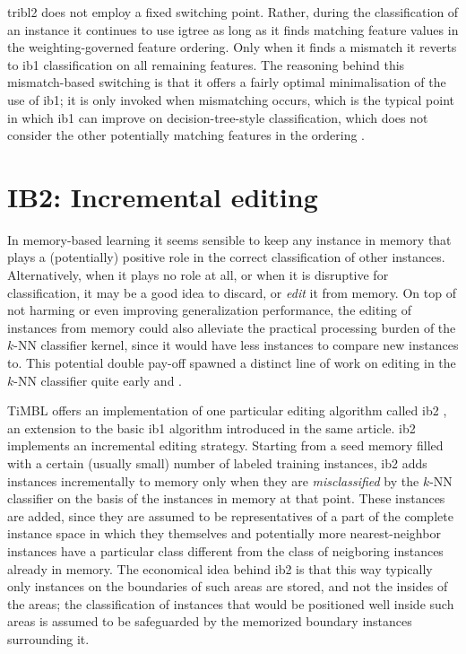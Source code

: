 \documentclass{report}
\begin{document}
{\sc tribl2} does not employ a fixed switching point. Rather, during
the classification of an instance it continues to use {\sc igtree} as
long as it finds matching feature values in the weighting-governed
feature ordering. Only when it finds a mismatch it reverts to {\sc
ib1} classification on all remaining features. The reasoning behind
this mismatch-based switching is that it offers a fairly optimal
minimalisation of the use of {\sc ib1}; it is only invoked when
mismatching occurs, which is the typical point in which {\sc ib1} can
improve on decision-tree-style classification, which does not consider
the other potentially matching features in the ordering
\cite{Daelemans+99}.

\section{IB2: Incremental editing}
\label{ib2}

In memory-based learning it seems sensible to keep any instance in
memory that plays a (potentially) positive role in the correct
classification of other instances. Alternatively, when it plays no
role at all, or when it is disruptive for classification, it may be a
good idea to discard, or {\em edit} it from memory. On top of not
harming or even improving generalization performance, the editing of
instances from memory could also alleviate the practical processing
burden of the $k$-NN classifier kernel, since it would have less
instances to compare new instances to. This potential double pay-off
spawned a distinct line of work on editing in the $k$-NN classifier
quite early  and .

TiMBL offers an implementation of one particular editing algorithm
called {\sc ib2} \cite{Aha+91}, an extension to the basic {\sc ib1}
algorithm introduced in the same article. {\sc ib2} implements an
incremental editing strategy. Starting from a seed memory filled with
a certain (usually small) number of labeled training instances, {\sc
ib2} adds instances incrementally to memory only when they are {\em
misclassified}\/ by the $k$-NN classifier on the basis of the
instances in memory at that point. These instances are added, since
they are assumed to be representatives of a part of the complete
instance space in which they themselves and potentially more
nearest-neighbor instances have a particular class different from the
class of neigboring instances already in memory. The economical idea
behind {\sc ib2} is that this way typically only instances on the
boundaries of such areas are stored, and not the insides of the areas;
the classification of instances that would be positioned well inside
such areas is assumed to be safeguarded by the memorized boundary
instances surrounding it.
\end{document}
